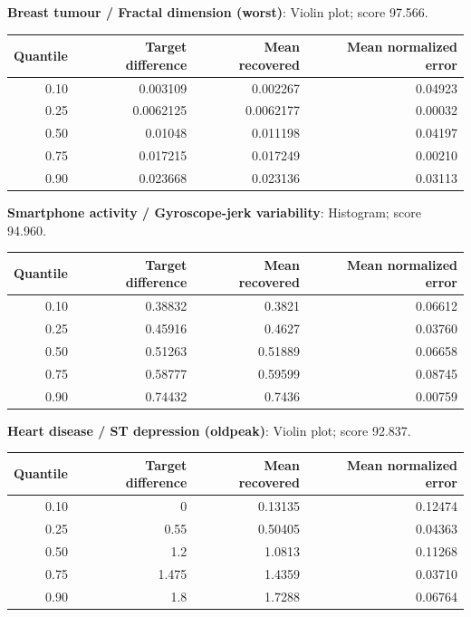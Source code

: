 \begin{minipage}{\linewidth}\textbf{Breast tumour / Fractal dimension (worst)}: Violin plot; score 97.566.
\begin{center}\begin{tabular}{rrrr}\toprule
Quantile & Target difference & Mean recovered & Mean normalized error\\\midrule
0.10 & 0.003109 & 0.002267 & 0.04923\\
0.25 & 0.0062125 & 0.0062177 & 0.00032\\
0.50 & 0.01048 & 0.011198 & 0.04197\\
0.75 & 0.017215 & 0.017249 & 0.00210\\
0.90 & 0.023668 & 0.023136 & 0.03113\\
\bottomrule\end{tabular}\end{center}\end{minipage}\par\medskip
\begin{minipage}{\linewidth}\textbf{Smartphone activity / Gyroscope-jerk variability}: Histogram; score 94.960.
\begin{center}\begin{tabular}{rrrr}\toprule
Quantile & Target difference & Mean recovered & Mean normalized error\\\midrule
0.10 & 0.38832 & 0.3821 & 0.06612\\
0.25 & 0.45916 & 0.4627 & 0.03760\\
0.50 & 0.51263 & 0.51889 & 0.06658\\
0.75 & 0.58777 & 0.59599 & 0.08745\\
0.90 & 0.74432 & 0.7436 & 0.00759\\
\bottomrule\end{tabular}\end{center}\end{minipage}\par\medskip
\begin{minipage}{\linewidth}\textbf{Heart disease / ST depression (oldpeak)}: Violin plot; score 92.837.
\begin{center}\begin{tabular}{rrrr}\toprule
Quantile & Target difference & Mean recovered & Mean normalized error\\\midrule
0.10 & 0 & 0.13135 & 0.12474\\
0.25 & 0.55 & 0.50405 & 0.04363\\
0.50 & 1.2 & 1.0813 & 0.11268\\
0.75 & 1.475 & 1.4359 & 0.03710\\
0.90 & 1.8 & 1.7288 & 0.06764\\
\bottomrule\end{tabular}\end{center}\end{minipage}\par\medskip
